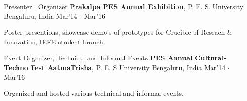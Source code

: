 \begin{cventries}

	\cventry
	{Presenter | Organizer}
	{\textbf{Prakalpa PES Annual Exhibition}\href{http://pes.edu/clubs/prakalpa/}, P. E. S. University}
	{Bengaluru, India}
	{Mar'14 - Mar'16}
	{
		\begin{cvitems}
		\item{Poster presentions, showcase demo's of prototypes for Crucible of Reseach \& Innovation, IEEE student branch.}
		\end{cvitems}
	}

	\cventry
	{Event Organizer, Technical and Informal Events}
	{\textbf{PES Annual Cultural- Techno Fest AatmaTrisha}\href{http://pes.edu/clubs/atmatrisha/}, P. E. S University}
	{Bengaluru, India}
	{Mar'14 - Mar'16}
	{
		\begin{cvitems}
		\item{Organized and hosted various technical and informal events.}
		\end{cvitems}
	}

\end{cventries}
